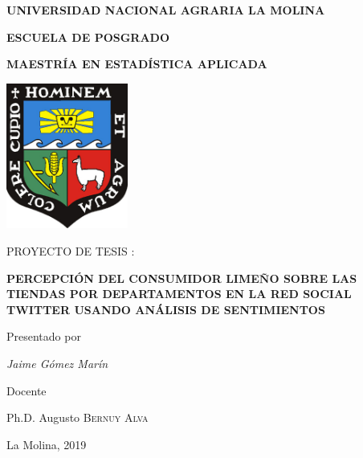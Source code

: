 \begin{titlepage}
	\centering
	{\scshape\LARGE\bfseries UNIVERSIDAD NACIONAL AGRARIA  LA MOLINA \par}
	\vspace{0.60cm}	
	{\scshape\large\bfseries ESCUELA DE POSGRADO \par}
	\vspace{0.60cm}	
	{\scshape\large\bfseries MAESTR\'IA EN ESTAD\'ISTICA APLICADA  \par}
	\vspace{0.60cm}	
	
	\includegraphics[width=0.30\textwidth]{img/323x386_ESCUDOCOLOR}\par\vspace{1cm}
	{\scshape\large PROYECTO DE TESIS : \par}
	\vspace{0.60cm}
	{\large\bfseries PERCEPCI\'ON DEL CONSUMIDOR LIME\~NO SOBRE LAS TIENDAS POR DEPARTAMENTOS EN LA RED SOCIAL TWITTER USANDO AN\'ALISIS DE SENTIMIENTOS\par}
	\vspace{0.60cm}

	\vfill
	Presentado por \par
	{\large\itshape { Jaime G\'omez Mar\'in }\par}
	\vspace{0.30cm}
	\vfill
	Docente \par
	Ph.D. Augusto  \textsc{Bernuy Alva}
	
  \vspace{0.30cm}
	\vfill
        {\large La Molina, 2019 \par}
\end{titlepage}

